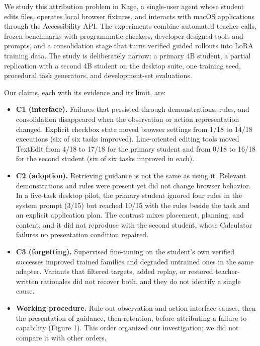 \documentclass[
  10pt,
]{article}
\providecommand{\tightlist}{%
  \setlength{\itemsep}{0pt}\setlength{\parskip}{0pt}}
\begin{document}
We study this attribution problem in Kage, a single-user agent whose
student edits files, operates local browser fixtures, and interacts with
macOS applications through the Accessibility API. The experiments
combine automated teacher calls, frozen benchmarks with programmatic
checkers, developer-designed tools and prompts, and a consolidation
stage that turns verified guided rollouts into LoRA training data. The
study is deliberately narrow: a primary 4B student, a partial
replication with a second 4B student on the desktop suite, one training
seed, procedural task generators, and development-set evaluations.

Our claims, each with its evidence and its limit, are:

\begin{itemize}
\tightlist
\item
  \textbf{C1 (interface).} Failures that persisted through
  demonstrations, rules, and consolidation disappeared when the
  observation or action representation changed. Explicit checkbox state
  moved browser settings from 1/18 to 14/18 executions (six of six tasks
  improved). Line-oriented editing tools moved TextEdit from 4/18 to
  17/18 for the primary student and from 0/18 to 16/18 for the second
  student (six of six tasks improved in each).
\item
  \textbf{C2 (adoption).} Retrieving guidance is not the same as using
  it. Relevant demonstrations and rules were present yet did not change
  browser behavior. In a five-task desktop pilot, the primary student
  ignored four rules in the system prompt (3/15) but reached 10/15 with
  the rules beside the task and an explicit application plan. The
  contrast mixes placement, planning, and content, and it did not
  reproduce with the second student, whose Calculator failures no
  presentation condition repaired.
\item
  \textbf{C3 (forgetting).} Supervised fine-tuning on the student's own
  verified successes improved trained families and degraded untrained
  ones in the same adapter. Variants that filtered targets, added
  replay, or restored teacher-written rationales did not recover both,
  and they do not identify a single cause.
\item
  \textbf{Working procedure.} Rule out observation and action-interface
  causes, then the presentation of guidance, then retention, before
  attributing a failure to capability (Figure 1). This order organized
  our investigation; we did not compare it with other orders.
\end{itemize}
\end{document}
